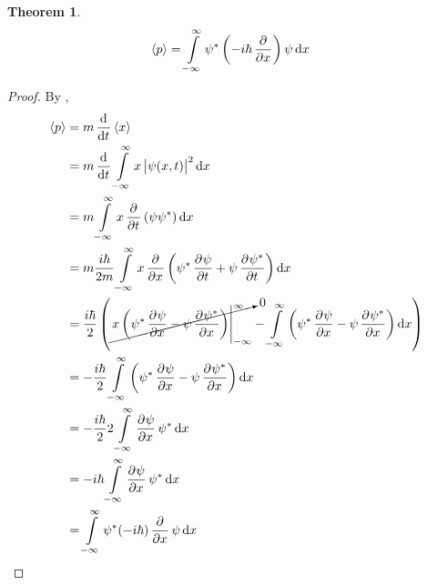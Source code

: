 \documentclass[titlepage, fleqn, a4paper, 12pt, twoside]{article}
\theoremstyle{definition}
\theoremstyle{theorem}
\newtheorem{theorem}{Theorem}
\begin{document}
\begin{theorem}
	\begin{align*}
		\langle p \rangle & = \int\limits_{-\infty}^{\infty} \psi^* \left( -i \hbar \dpd{}{x} \right) \psi \dif x
	\end{align*}
\end{theorem}

\begin{proof}
	By ,
	\begin{align*}
		\langle p \rangle & = m \dod{}{t} \langle x \rangle                                                                                                                                                                                                                    \\
                                  & = m \dod{}{t} \int\limits_{-\infty}^{\infty} x \left| \psi(x,t) \right|^2 \dif x                                                                                                                                                                   \\
                                  & = m \int\limits_{-\infty}^{\infty} x \dpd{}{t}\left( \psi \psi^* \right) \dif x                                                                                                                                                                    \\
                                  & = m \frac{i \hbar}{2 m} \int\limits_{-\infty}^{\infty} x \dpd{}{x}\left( \psi^* \dpd{\psi}{t} + \psi \dpd{\psi^*}{t} \right) \dif x                                                                                                                \\
                                  & = \frac{i \hbar}{2} \left( \cancelto{0}{\left. x \left( \psi^* \dpd{\psi}{x} - \psi \dpd{\psi^*}{x} \right) \right|_{-\infty}^{\infty}} - \int\limits_{-\infty}^{\infty} \left( \psi^* \dpd{\psi}{x} - \psi \dpd{\psi^*}{x} \right) \dif x \right) \\
                                  & = -\frac{i \hbar}{2} \int\limits_{-\infty}^{\infty} \left( \psi^* \dpd{\psi}{x} - \psi \dpd{\psi^*}{x} \right) \dif x                                                                                                                              \\
                                  & = -\frac{i \hbar}{2} 2 \int\limits_{-\infty}^{\infty} \dpd{\psi}{x} \psi^* \dif x                                                                                                                                                                  \\
                                  & = -i \hbar \int\limits_{-\infty}^{\infty} \dpd{\psi}{x} \psi^* \dif x                                                                                                                                                                              \\
                                  & = \int\limits_{-\infty}^{\infty} \psi^* (-i \hbar) \dpd{}{x} \psi \dif x
	\end{align*}
\end{proof}
\end{document}
